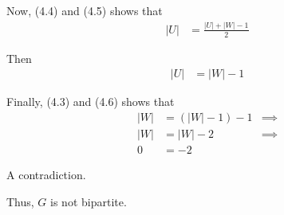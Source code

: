 \documentclass[a4paper,10pt, leqno]{article}
\theoremstyle{definition}
\begin{document}
Now, (4.4) and (4.5) shows that 
\begin{align*}
|U| &= \frac{|U| + |W| - 1}{2}
\end{align*}

Then
\begin{align*}
\tag{4.6}
|U| &= |W| - 1
\end{align*}

Finally, (4.3) and (4.6) shows that 
\begin{align*}
|W| &= (|W| - 1) - 1 &\implies \\
|W| &= |W| - 2 &\implies \\
0 &= -2
\end{align*}

A contradiction.

Thus, $G$ is not bipartite.
\end{document}
